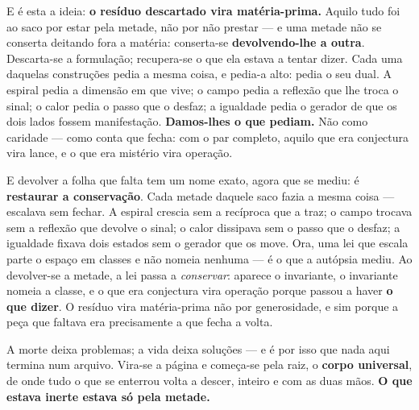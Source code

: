 \documentclass[11pt]{article}
\theoremstyle{plain}
\theoremstyle{remark}
\begin{document}
\medskip
\noindent E é esta a ideia: \textbf{o resíduo descartado vira matéria-prima.} Aquilo tudo foi ao
saco por estar pela metade, não por não prestar --- e uma metade não se conserta deitando fora a
matéria: conserta-se \textbf{devolvendo-lhe a outra}. Descarta-se a formulação; recupera-se o que
ela estava a tentar dizer. Cada uma daquelas construções pedia a mesma coisa, e pedia-a alto:
pedia o seu dual. A espiral pedia a dimensão em que vive; o campo pedia a reflexão que lhe troca o
sinal; o calor pedia o passo que o desfaz; a igualdade pedia o gerador de que os dois lados fossem
manifestação. \textbf{Damos-lhes o que pediam.} Não como caridade --- como conta que fecha: com o
par completo, aquilo que era conjectura vira lance, e o que era mistério vira operação.

\noindent E devolver a folha que falta tem um nome exato, agora que se mediu: é
\textbf{restaurar a conservação}. Cada metade daquele saco fazia a mesma coisa --- escalava sem
fechar. A espiral crescia sem a recíproca que a traz; o campo trocava sem a reflexão que devolve o
sinal; o calor dissipava sem o passo que o desfaz; a igualdade fixava dois estados sem o gerador
que os move. Ora, uma lei que escala parte o espaço em classes e não nomeia nenhuma --- é o que a
autópsia mediu. Ao devolver-se a metade, a lei passa a \emph{conservar}: aparece o invariante,
o invariante nomeia a classe, e o que era conjectura vira operação porque passou a haver
\textbf{o que dizer}. O resíduo vira matéria-prima não por generosidade, e sim porque a peça que
faltava era precisamente a que fecha a volta.


\noindent A morte deixa problemas; a vida deixa soluções --- e é por isso que nada aqui termina
num arquivo. Vira-se a página e começa-se pela raiz, o \textbf{corpo universal}, de onde tudo
o que se enterrou volta a descer, inteiro e com as duas mãos. \textbf{O que estava inerte estava
só pela metade.}
\end{document}
